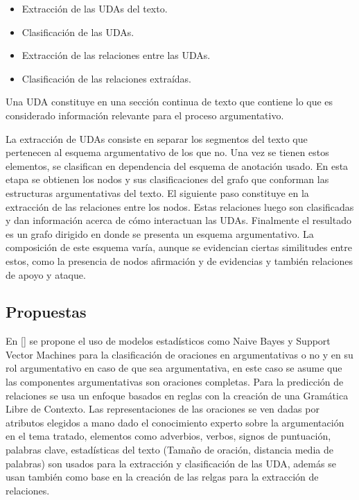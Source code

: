 \begin{itemize}
    \item Extracción de las UDAs del texto.
    \item Clasificación de las UDAs.
    \item Extracción de las relaciones entre las UDAs.
    \item Clasificación de las relaciones extraídas.
\end{itemize}

Una UDA constituye en una sección continua de texto que contiene lo que es considerado información
relevante para el proceso argumentativo. 

La extracción de UDAs consiste en separar los segmentos del texto que pertenecen al esquema argumentativo
de los que no. Una vez se tienen estos elementos, se clasifican en dependencia del esquema de anotación
usado. En esta etapa se obtienen los nodos y sus clasificaciones del grafo que conforman las estructuras 
argumentativas del texto. El siguiente paso constituye en la extracción de las relaciones entre los nodos.
Estas relaciones luego son clasificadas y dan información acerca de cómo interactuan las UDAs. Finalmente
el resultado es un grafo dirigido en donde se presenta un esquema argumentativo. La composición de este esquema
varía, aunque se evidencian ciertas similitudes entre estos, como la presencia de nodos afirmación y de evidencias
y también relaciones de apoyo y ataque.

\subsection{Propuestas}

En [\cite{palau2009argumentation}] se propone
el uso de modelos estadísticos como Naive Bayes y Support Vector Machines para la clasificación de 
oraciones en argumentativas o no y en su rol argumentativo en caso de que sea argumentativa, en este
caso se asume que las componentes argumentativas son oraciones completas. Para la predicción de relaciones
se usa un enfoque basados en reglas con la creación de una Gramática Libre de Contexto. Las representaciones
de las oraciones se ven dadas por atributos elegidos a mano dado el conocimiento experto sobre la argumentación
en el tema tratado, elementos como adverbios, verbos, signos de puntuación, palabras clave, estadísticas del texto
(Tamaño de oración, distancia media de palabras) son usados para la extracción y clasificación de las UDA, además
se usan también como base en la creación de las relgas para la extracción de relaciones.

